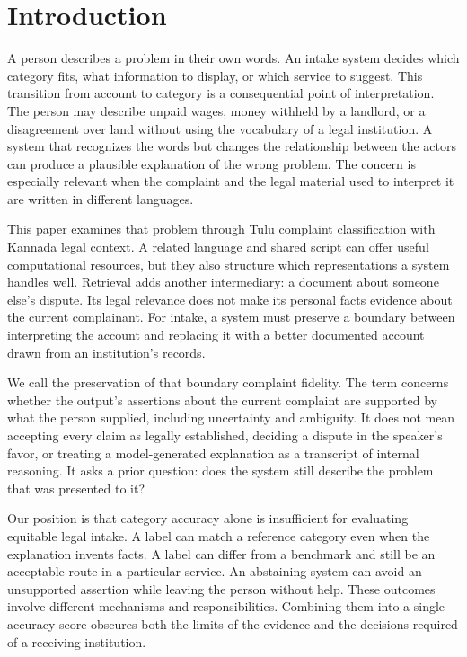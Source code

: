 \documentclass[manuscript,screen,review,anonymous]{acmart}
\begin{document}
\section{Introduction}

A person describes a problem in their own words. An intake system decides which category fits, what information to display, or which service to suggest. This transition from account to category is a consequential point of interpretation. The person may describe unpaid wages, money withheld by a landlord, or a disagreement over land without using the vocabulary of a legal institution. A system that recognizes the words but changes the relationship between the actors can produce a plausible explanation of the wrong problem. The concern is especially relevant when the complaint and the legal material used to interpret it are written in different languages.

This paper examines that problem through Tulu complaint classification with Kannada legal context. A related language and shared script can offer useful computational resources, but they also structure which representations a system handles well. Retrieval adds another intermediary: a document about someone else's dispute. Its legal relevance does not make its personal facts evidence about the current complainant. For intake, a system must preserve a boundary between interpreting the account and replacing it with a better documented account drawn from an institution's records.

We call the preservation of that boundary complaint fidelity. The term concerns whether the output's assertions about the current complaint are supported by what the person supplied, including uncertainty and ambiguity. It does not mean accepting every claim as legally established, deciding a dispute in the speaker's favor, or treating a model-generated explanation as a transcript of internal reasoning. It asks a prior question: does the system still describe the problem that was presented to it?

Our position is that category accuracy alone is insufficient for evaluating equitable legal intake. A label can match a reference category even when the explanation invents facts. A label can differ from a benchmark and still be an acceptable route in a particular service. An abstaining system can avoid an unsupported assertion while leaving the person without help. These outcomes involve different mechanisms and responsibilities. Combining them into a single accuracy score obscures both the limits of the evidence and the decisions required of a receiving institution.
\end{document}
